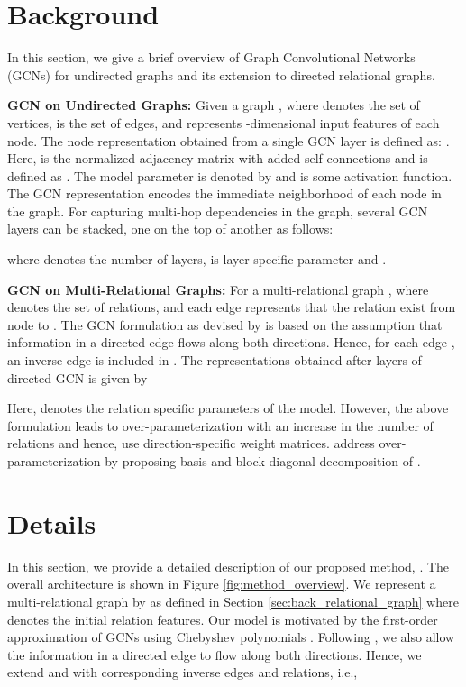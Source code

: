 \documentclass{article} \usepackage{iclr2020_conference,times}
\begin{document}
 \section{Background}
\label{sec:background}


In this section, we give a brief overview of Graph Convolutional Networks (GCNs) for undirected graphs and its extension to directed relational graphs.

\textbf{GCN on Undirected Graphs:}
\label{sec:back_undirected_graph}
Given a graph , where  denotes the set of vertices,  is the set of edges, and  represents -dimensional input features of each node. The node representation obtained from a single GCN layer is defined as:
.
Here,  is the normalized adjacency matrix with added self-connections and  is defined as . The model parameter is denoted by  and  is some activation function. The GCN representation  encodes the immediate neighborhood of each node in the graph. For capturing multi-hop dependencies in the graph, several GCN layers can be stacked, one on the top of another as follows:

where  denotes the number of layers,  is layer-specific parameter and .

\textbf{GCN on Multi-Relational Graphs:}
\label{sec:back_relational_graph}
For a multi-relational graph , where  denotes the set of relations, and each edge  represents that the relation  exist from node  to . The GCN formulation as devised by \citet{gcn_srl} is based on the assumption that information in a directed edge flows along both directions. Hence, for each edge , an inverse edge  is included in . The representations obtained after  layers of directed GCN is given by

Here,  denotes the relation specific parameters of the model. However, the above formulation leads to over-parameterization with an increase in the number of relations and hence, \citet{gcn_srl} use direction-specific weight matrices. \citet{r_gcn} address over-parameterization by proposing basis and block-diagonal decomposition of .
%
 \section{\method{} Details}
\label{sec:details}

In this section, we provide a detailed description of our proposed method, \method{}. The overall architecture is shown in Figure \ref{fig:method_overview}. We represent a multi-relational graph by  as defined in Section \ref{sec:back_relational_graph} where  denotes the initial relation features. Our model is motivated by the first-order approximation of GCNs using Chebyshev polynomials \citep{Kipf2016}. Following \citet{gcn_srl}, we also allow the information in a directed edge to flow along both directions. Hence, we extend  and  with corresponding inverse edges and relations, i.e., 
\end{document}
